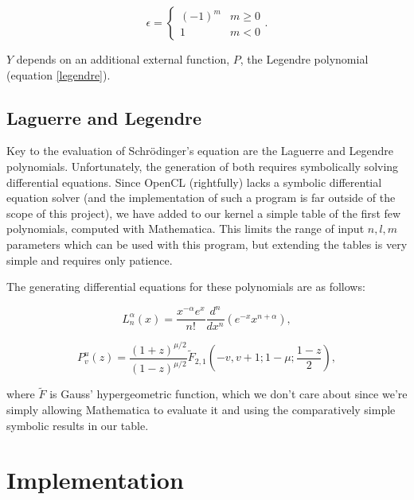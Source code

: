 \documentclass{acmsiggraph}
\begin{document}
\begin{equation}\label{yEpsilon}
\epsilon=\begin{cases}
\left(-1\right)^m & \text{$m\ge0$} \\
1 & \text{$m<0$}
\end{cases}.
\end{equation}

$Y$ depends on an additional external function, $P$, the Legendre polynomial (equation \ref{legendre}).

\subsection{Laguerre and Legendre\label{laguerreLegendre}}

Key to the evaluation of Schr\"{o}dinger's equation are the Laguerre and Legendre polynomials. Unfortunately, the generation of both requires symbolically solving differential equations. \cite{legendreCite} Since OpenCL (rightfully) lacks a symbolic differential equation solver (and the implementation of such a program is far outside of the scope of this project), we have added to our kernel a simple table of the first few polynomials, computed with Mathematica. This limits the range of input $n, l, m$ parameters which can be used with this program, but extending the tables is very simple and requires only patience.

The generating differential equations for these polynomials are as follows:

\begin{equation}\label{laguerre}
L^\alpha_n\left(x\right)=\frac{x^{-\alpha}e^x}{n!}\frac{d^n}{dx^n}\left(e^{-x}x^{n+\alpha}\right),
\end{equation}

\begin{equation}\label{legendre}
P^u_v\left(z\right)=\frac{\left(1+z\right)^{\mu/2}}{\left(1-z\right)^{\mu/2}}
\tilde{F}_{2,1}
\left(-v,v+1;1-\mu;\frac{1-z}{2}\right),
\end{equation}

where $\tilde{F}$ is Gauss' hypergeometric function, which we don't care about since we're simply allowing Mathematica to evaluate it and using the comparatively simple symbolic results in our table.

\section{Implementation}
\end{document}
